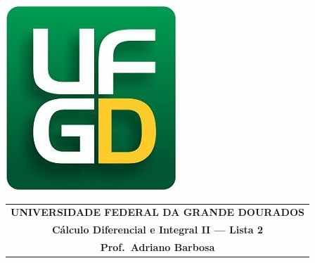 \documentclass[a4paper,5pt]{amsbook}
\begin{document}
\thispagestyle{empty}
\pagestyle{empty}
\begin{minipage}[h]{0.14\textwidth}
	\includegraphics[scale=0.24]{../../ufgd.png}
\end{minipage}
\begin{minipage}[h]{\textwidth}
\begin{tabular}{c}
{{\bf UNIVERSIDADE FEDERAL DA GRANDE DOURADOS}}\\
{{\bf C\'{a}lculo Diferencial e Integral II --- Lista 2}}\\
{{\bf Prof.\ Adriano Barbosa}}\\
\end{tabular}
\vspace{-0.45cm}
%
\end{minipage}

\end{document}
